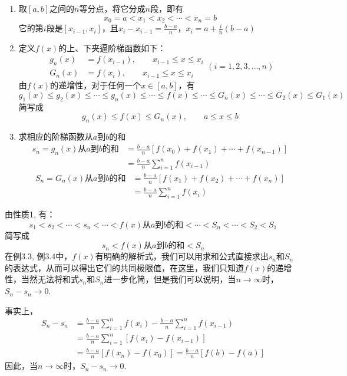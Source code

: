 \begin{solution}
\begin{enumerate}
    \item     取$[a,b]$之间的$n$等分点，将它分成$n$段，即有
\[x_0=a<x_1<x_2<\cdots<x_n=b\]
它的第$i$段是$[x_{i-1},x_i]$，且$x_i-x_{i-1}=\frac{b-a}{n}$，$x_i=a+\frac{i}{n}(b-a)$

\item 定义$f(x)$的上、下夹逼阶梯函数如下：
\[\begin{split}
    g_n(x)&=f(x_{i-1}),\qquad x_{i-1}\le x\le x_i \\
    G_n(x)&=f(x_i),\qquad x_{i-1}\le x\le x_i 
\end{split}(i=1,2,3,\ldots,n)\]
由$f(x)$的递增性，对于任何一个$x\in[a,b]$，有
\[g_1(x)\le g_2(x)\le\cdots \le g_n(x)\le\cdots \le f(x)\le \cdots\le G_n(x)\le\cdots\le G_2(x)\le G_1(x)\]
简写成
\[g_n(x)\le f(x)\le G_n(x),\qquad a\le x\le b\]
\item 求相应的阶梯函数从$a$到$b$的和
\begin{equation}
\begin{split}
    s_n=g_n(x)\text{从$a$到$b$的和}
    &=\frac{b-a}{n}\left[f(x_0)+f(x_1)+\cdots+f(x_{n-1})\right]\\
    &=\frac{b-a}{n}\sum^n_{i=1}f(x_{i-1})
\end{split}
\end{equation}
\begin{equation}
    \begin{split}
    S_n=G_n(x)\text{从$a$到$b$的和}
    &=\frac{b-a}{n}\left[f(x_1)+f(x_2)+\cdots+f(x_{n})\right]\\
    &=\frac{b-a}{n}\sum^n_{i=1}f(x_{i})   
    \end{split}
    \end{equation}
\end{enumerate}
由性质1, 有：
\[s_1<s_2<\cdots<s_n<\cdots<f(x)\text{从$a$到$b$的和}<\cdots<S_n<\cdots<S_2<S_1\]
简写成
\begin{equation}
    s_n<f(x)\text{从$a$到$b$的和}<S_n
\end{equation}
在例3.3, 例3.4中，$f(x)$有明确的解析式，我们可以用求和公式直接求出$s_n$和$S_n$的表达式，从而可以得出它们的共同极限值，在这里，我们只知道$f(x)$的递增性，当然无法将和式$s_n$和$S_n$进一步化简，但是我们可以说明，当$n\to\infty$时，$S_n-s_n\to 0$.

事实上，
\[\begin{split}
    S_n-s_n&=\frac{b-a}{n}\sum^n_{i=1}f(x_{i})   -\frac{b-a}{n}\sum^n_{i=1}f(x_{i-1}) \\
    &=\frac{b-a}{n}\sum^n_{i=1}\left[f(x_{i})-f(x_{i-1})\right]   \\
    &=\frac{b-a}{n}\left[f(x_{n})-f(x_{0})\right]  =\frac{b-a}{n}\left[f(b)-f(a)\right]   
\end{split}\]
因此，当$n\to\infty$时，$S_n-s_n\to 0$.


\end{solution}
